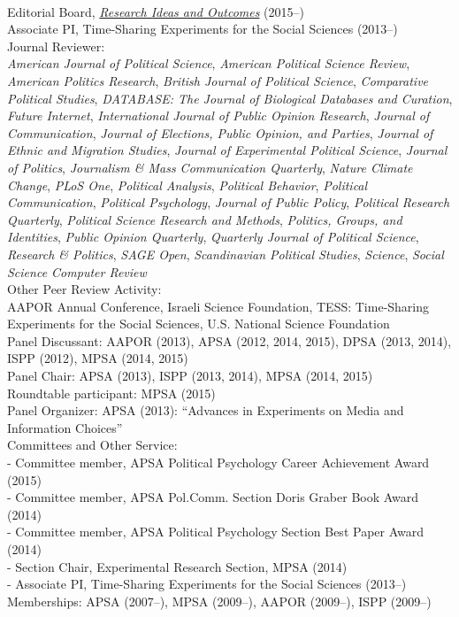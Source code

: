 \documentclass[12pt]{article}
\newcommand{\topic}[1]{\pagebreak[3]\indent {\color{lg}{\footnotesize #1 }}\\}
\newcommand{\entry}[1]{\indent {\color{lg}\guillemotright}\hspace{2pt}#1\vspace{.25em}\\}
\newcommand{\subentry}[1]{{\color{lg}-} #1\vspace{.25em}\\}
\begin{document}
\topic{Disciplinary}
\entry{Editorial Board, \href{http://riojournal.com/}{{\em Research Ideas and Outcomes}} (2015--)}
\entry{Associate PI, Time-Sharing Experiments for the Social Sciences (2013--)}
\entry{Journal Reviewer:\\{\em American Journal of Political Science}, {\em American Political Science Review}, {\em American Politics Research}, {\em British Journal of Political Science}, {\em Comparative Political Studies}, {\em DATABASE: The Journal of Biological Databases and Curation}, {\em Future Internet}, {\em International Journal of Public Opinion Research}, {\em Journal of Communication}, {\em Journal of Elections, Public Opinion, and Parties}, {\em Journal of Ethnic and Migration Studies}, {\em Journal of Experimental Political Science}, {\em Journal of Politics}, {\em Journalism \& Mass Communication Quarterly}, {\em Nature Climate Change}, {\em PLoS One}, {\em Political Analysis}, {\em Political Behavior}, {\em Political Communication}, {\em Political Psychology}, {\em Journal of Public Policy}, {\em Political Research Quarterly}, {\em Political Science Research and Methods}, {\em Politics, Groups, and Identities}, {\em Public Opinion Quarterly}, {\em Quarterly Journal of Political Science}, {\em Research \& Politics}, {\em SAGE Open}, {\em Scandinavian Political Studies}, {\em Science}, {\em Social Science Computer Review}}
\entry{Other Peer Review Activity:\\ AAPOR Annual Conference, Israeli Science Foundation, TESS: Time-Sharing Experiments for the Social Sciences, U.S. National Science Foundation}
\entry{Panel Discussant: AAPOR (2013), APSA (2012, 2014, 2015), DPSA (2013, 2014), ISPP (2012), MPSA (2014, 2015)}
\entry{Panel Chair: APSA (2013), ISPP (2013, 2014), MPSA (2014, 2015)}
\entry{Roundtable participant: MPSA (2015)}
\entry{Panel Organizer: APSA (2013): ``Advances in Experiments on Media and Information Choices''}
\entry{Committees and Other Service:}
\subentry{Committee member, APSA Political Psychology Career Achievement Award (2015)}
\subentry{Committee member, APSA Pol.Comm. Section Doris Graber Book Award (2014)}
\subentry{Committee member, APSA Political Psychology Section Best Paper Award (2014)}
\subentry{Section Chair, Experimental Research Section, MPSA (2014)}
\subentry{Associate PI, Time-Sharing Experiments for the Social Sciences (2013--)}
\entry{Memberships: APSA (2007--), MPSA (2009--), AAPOR (2009--), ISPP (2009--)}
\end{document}
